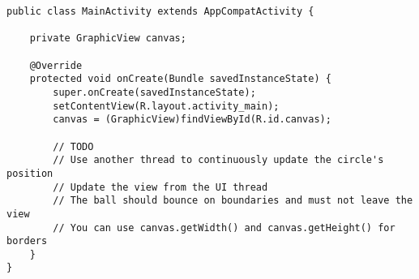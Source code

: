 \begin{lstlisting}[style=A_Java]
public class MainActivity extends AppCompatActivity {

    private GraphicView canvas;

    @Override
    protected void onCreate(Bundle savedInstanceState) {
        super.onCreate(savedInstanceState);
        setContentView(R.layout.activity_main);
        canvas = (GraphicView)findViewById(R.id.canvas);

        // TODO
        // Use another thread to continuously update the circle's position
        // Update the view from the UI thread
        // The ball should bounce on boundaries and must not leave the view
        // You can use canvas.getWidth() and canvas.getHeight() for borders
    }
}
\end{lstlisting}
